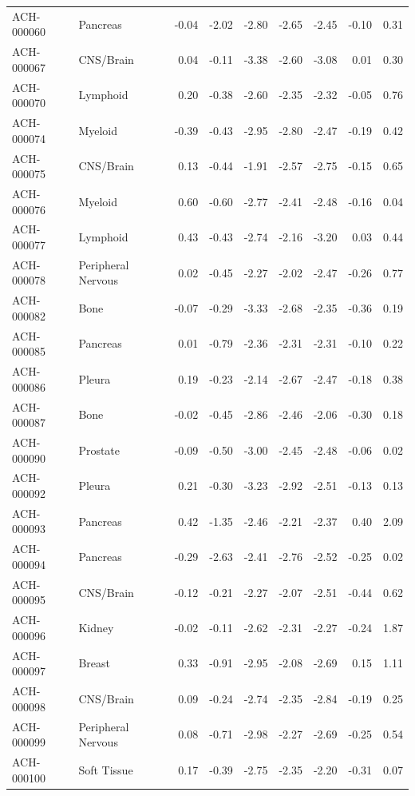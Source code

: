 \begin{footnotesize}
\begin{longtable}{llrrrrrrr}
ACH-000060 & Pancreas & -0.04 & -2.02 & -2.80 & -2.65 & -2.45 & -0.10 & 0.31 \\
ACH-000067 & CNS/Brain & 0.04 & -0.11 & -3.38 & -2.60 & -3.08 & 0.01 & 0.30 \\
ACH-000070 & Lymphoid & 0.20 & -0.38 & -2.60 & -2.35 & -2.32 & -0.05 & 0.76 \\
ACH-000074 & Myeloid & -0.39 & -0.43 & -2.95 & -2.80 & -2.47 & -0.19 & 0.42 \\
ACH-000075 & CNS/Brain & 0.13 & -0.44 & -1.91 & -2.57 & -2.75 & -0.15 & 0.65 \\
ACH-000076 & Myeloid & 0.60 & -0.60 & -2.77 & -2.41 & -2.48 & -0.16 & 0.04 \\
ACH-000077 & Lymphoid & 0.43 & -0.43 & -2.74 & -2.16 & -3.20 & 0.03 & 0.44 \\
ACH-000078 & Peripheral Nervous & 0.02 & -0.45 & -2.27 & -2.02 & -2.47 & -0.26 & 0.77 \\
ACH-000082 & Bone & -0.07 & -0.29 & -3.33 & -2.68 & -2.35 & -0.36 & 0.19 \\
ACH-000085 & Pancreas & 0.01 & -0.79 & -2.36 & -2.31 & -2.31 & -0.10 & 0.22 \\
ACH-000086 & Pleura & 0.19 & -0.23 & -2.14 & -2.67 & -2.47 & -0.18 & 0.38 \\
ACH-000087 & Bone & -0.02 & -0.45 & -2.86 & -2.46 & -2.06 & -0.30 & 0.18 \\
ACH-000090 & Prostate & -0.09 & -0.50 & -3.00 & -2.45 & -2.48 & -0.06 & 0.02 \\
ACH-000092 & Pleura & 0.21 & -0.30 & -3.23 & -2.92 & -2.51 & -0.13 & 0.13 \\
ACH-000093 & Pancreas & 0.42 & -1.35 & -2.46 & -2.21 & -2.37 & 0.40 & 2.09 \\
ACH-000094 & Pancreas & -0.29 & -2.63 & -2.41 & -2.76 & -2.52 & -0.25 & 0.02 \\
ACH-000095 & CNS/Brain & -0.12 & -0.21 & -2.27 & -2.07 & -2.51 & -0.44 & 0.62 \\
ACH-000096 & Kidney & -0.02 & -0.11 & -2.62 & -2.31 & -2.27 & -0.24 & 1.87 \\
ACH-000097 & Breast & 0.33 & -0.91 & -2.95 & -2.08 & -2.69 & 0.15 & 1.11 \\
ACH-000098 & CNS/Brain & 0.09 & -0.24 & -2.74 & -2.35 & -2.84 & -0.19 & 0.25 \\
ACH-000099 & Peripheral Nervous & 0.08 & -0.71 & -2.98 & -2.27 & -2.69 & -0.25 & 0.54 \\
ACH-000100 & Soft Tissue & 0.17 & -0.39 & -2.75 & -2.35 & -2.20 & -0.31 & 0.07 \\

\end{longtable}
\end{footnotesize}
